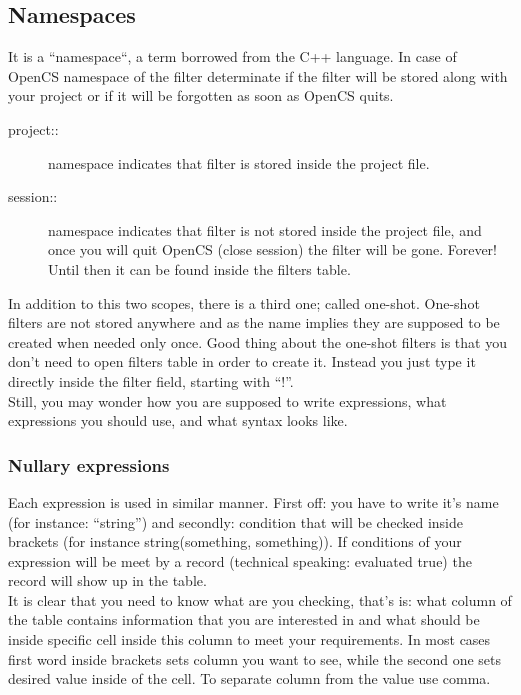 \subsection{Namespaces}
It is a ``namespace``, a term borrowed from the C++ language. In case of OpenCS namespace of the filter determinate if the filter will be stored along with your project or if it will be forgotten as soon as OpenCS quits.
\begin{description}
 \item[project::] namespace indicates that filter is stored inside the project file.
 \item[session::] namespace indicates that filter is not stored inside the project file, and once you will quit OpenCS (close session) the filter will be gone. Forever! Until then it can be found inside the filters table.
\end{description}
In addition to this two scopes, there is a third one; called one-shot. One-shot filters are not stored anywhere and as the name implies they are supposed to be created when needed only once. Good thing about the one-shot filters is that you don't need to open filters table in order to create it. Instead you just type it directly inside the filter field, starting with ``!''.\\
Still, you may wonder how you are supposed to write expressions, what expressions you should use, and what syntax looks like.

\subsubsection{Nullary expressions}
Each expression is used in similar manner. First off: you have to write it's name (for instance: ``string'') and secondly: condition that will be checked inside brackets (for instance string(something, something)). If conditions of your expression will be meet by a record (technical speaking: evaluated true) the record will show up in the table.\\
It is clear that you need to know what are you checking, that's is: what column of the table contains information that you are interested in and what should be inside specific cell inside this column to meet your requirements. In most cases first word inside brackets sets column you want to see, while the second one sets desired value inside of the cell. To separate column from the value use comma.  

